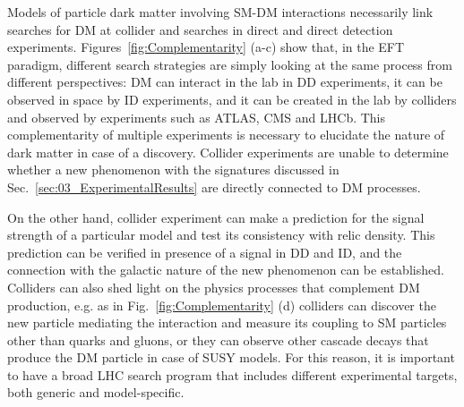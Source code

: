 Models of particle dark matter involving SM-DM interactions necessarily link searches for DM at collider and searches in direct and direct detection experiments. Figures~\ref{fig:Complementarity} (a-c) show that, in the EFT paradigm, different search strategies are simply looking at the same process from different perspectives: DM can interact in the lab in DD experiments, it can be observed in space %
by ID experiments, and it can be created in the lab by colliders and observed by experiments such as ATLAS, CMS and LHCb. This complementarity of multiple experiments is necessary to elucidate the nature of dark matter in case of a discovery. Collider experiments are unable to determine whether a new phenomenon with the signatures discussed in Sec.~\ref{sec:03_ExperimentalResults} are directly connected to DM processes. %

On the other hand, collider experiment can make a prediction for the signal strength of a particular model and test its consistency with relic density. This prediction can be verified in presence of a signal in DD and ID, and the connection with the galactic nature of the new phenomenon can be established. Colliders can also shed light on the physics processes that complement DM production, e.g. as in Fig.~\ref{fig:Complementarity} (d) colliders can discover the new particle mediating the interaction and measure its coupling to SM particles other than quarks and gluons, or they can observe other cascade decays that produce the DM particle in case of SUSY models. For this reason, it is important to have a broad LHC search program that includes different experimental targets, both generic and model-specific.  %

